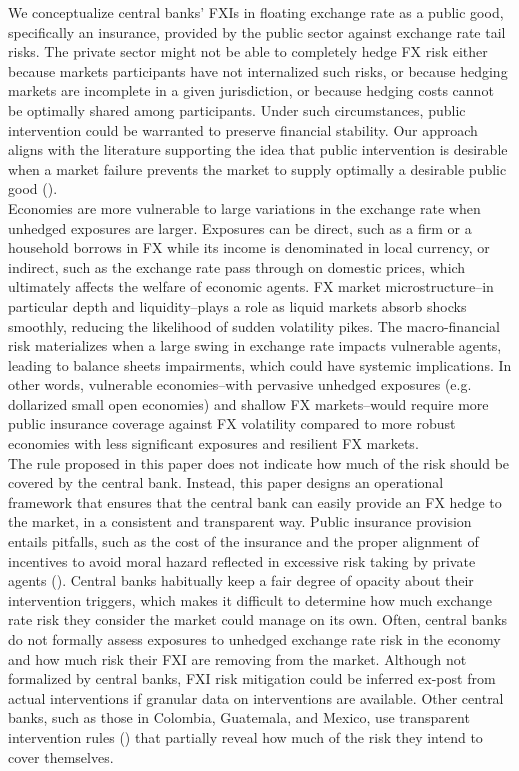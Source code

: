 \documentclass[11pt]{article}
\begin{document}
We conceptualize  central banks' FXIs  in floating  exchange rate as  a public
good,  specifically  an  insurance,  provided by  the  public  sector  against
exchange rate tail  risks. The private sector might not  be able to completely
hedge FX risk  either because markets participants have  not internalized such
risks, or because  hedging markets are incomplete in a  given jurisdiction, or
because hedging  costs cannot  be optimally  shared among  participants. Under
such  circumstances,  public  intervention  could  be  warranted  to  preserve
financial stability.  Our  approach aligns with the  literature supporting the
idea that public intervention is desirable  when a market failure prevents the
market to supply optimally a desirable public good (\cite{stiglitz1993}).\\

Economies are  more vulnerable to large  variations in the exchange  rate when
unhedged exposures are  larger. Exposures can be  direct, such as a  firm or a
household borrows in FX while its  income is denominated in local currency, or
indirect, such  as the exchange  rate pass  through on domestic  prices, which
ultimately affects the welfare of economic agents. FX market microstructure–in
particular depth  and liquidity–plays a  role as liquid markets  absorb shocks
smoothly,   reducing  the   likelihood  of   sudden  volatility   pikes.   The
macro-financial risk materializes when a  large swing in exchange rate impacts
vulnerable agents,  leading to  balance sheets  impairments, which  could have
systemic  implications. In  other words,  vulnerable economies–with  pervasive
unhedged  exposures (e.g.   dollarized small  open economies)  and shallow  FX
markets–would  require more  public insurance  coverage against  FX volatility
compared  to  more  robust  economies  with  less  significant  exposures  and
resilient FX markets.\\

The rule proposed in this paper does  not indicate how much of the risk should
be covered  by the central  bank. Instead,  this paper designs  an operational
framework that ensures that the central bank can easily provide an FX hedge to
the market,  in a consistent  and transparent way. Public  insurance provision
entails pitfalls, such  as the cost of the insurance  and the proper alignment
of incentives  to avoid  moral hazard  reflected in  excessive risk  taking by
private agents  (\cite{mckinnon2000}).  Central  banks habitually keep  a fair
degree of opacity about their  intervention triggers, which makes it difficult
to determine how much exchange rate risk they consider the market could manage
on its own.  Often, central banks do not formally assess exposures to unhedged
exchange rate  risk in the  economy and how much  risk their FXI  are removing
from the market. Although not formalized by central banks, FXI risk mitigation
could  be inferred  ex-post  from  actual interventions  if  granular data  on
interventions are available.  Other central  banks, such as those in Colombia,
Guatemala, and Mexico, use  transparent intervention rules (\cite{chamon2019})
that partially reveal how much of the risk they intend to cover themselves.\\
\end{document}
